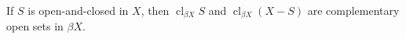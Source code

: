 If $S$ is open-and-closed in $X$, then $\operatorname{cl}_{\beta X} S$ and $\operatorname{cl}_{\beta X} (X - S)$ are complementary open sets in $\beta X$.
